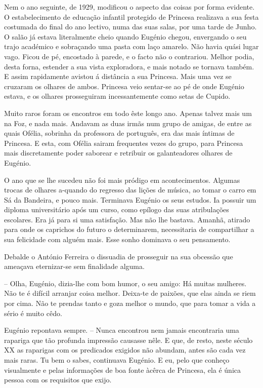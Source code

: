 \documentclass[9pt]{article}
\begin{document}
Nem o ano seguinte, de 1929, modificou o aspecto das coisas por forma
evidente. O estabelecimento de educa\-ção infantil protegido de Princesa realizava a sua festa costumada do final do ano lectivo, numa das
suas salas, por uma tarde de Junho. O salão já estava literalmente cheio
quan\-do Eugé\-nio chegou, envergando o seu trajo académico e sobraçando
uma pasta com laço amarelo. Não havia quási lugar vago. Ficou de pé,
encostado à parede, e o facto não o contrariou. Me\-lhor podia, desta forna, estender a sua vista exploradora, e mais notado se tornava também.
E assim rapidamente avistou á distância a sua Princesa. Mais uma vez
se cruzaram os o\-lhares de ambos. Princesa veio sentar-se ao pé de onde
Eugé\-nio estava, e os o\-lhares prosseguiram incessantemente como setas
de Cupido.

Muito raros foram os encontros em todo êste longo ano. Apenas
talvez mais um na Foz, e nada mais. Andavam as duas irmãs num grupo
de amigas, de entre as quais Ofélia, sobrinha da professora de por\-tu\-guês,
era das mais íntimas de Princesa. E esta, com Ofélia sairam frequentes
vezes do grupo, para Princesa mais discretamente poder saborear e retribuir os galanteadores o\-lhares de Eugé\-nio.


O ano que se lhe sucedeu não foi mais pródigo em acontecimentos. Algumas trocas de o\-lhares a-quan\-do do regresso das li\-ções de música, ao
tomar o carro em Sá da Bandeira, e pouco mais. Terminava Eugé\-nio os seus
estudos. Ia possuir um diploma universitário após um curso, como epílogo das suas atribula\-ções escolares. Era já para si uma satisfa\-ção. Mas
não lhe bastava. Amanhã, atirado para onde os caprichos do futuro o determinarem, necessitaria de comparti\-lhar a sua felicidade com alguém mais.
Esse sonho dominava o seu pensamento.

Debalde o António Ferreira o dissuadia de prosseguir na sua obcessão que ameaçava eternizar-se sem finalidade alguma.

-- O\-lha, Eugé\-nio, dizia-\-lhe com bom humor, o seu amigo: Há muitas mu\-lheres.
Não te é difícil arranjar coisa me\-lhor. Deixa-te de paixões, que elas
ainda se riem por cima. Não te prendas tanto e goza me\-lhor o mundo, que
para tomar a vida a sério é muito cêdo.

Eugé\-nio repontava sempre. -- Nunca encontrou nem jamais encontraria
uma rapariga que tão profunda impressão causasse nêle. E que, de resto, neste século
XX as raparigas com os predicados exigidos não abundam, antes são cada
vez mais raras. Tu bem o sabes, continuava Eugé\-nio. E eu, pelo que conheço visualmente e pelas informa\-ções de boa fonte àcêrca de Princesa, ela é
única pessoa com os requisitos que exijo.
\end{document}

